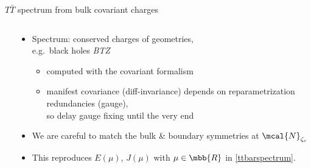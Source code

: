 \documentclass[
	10pt
	,handout
	,noamsthm
]{beamer}
\newcommand{\TTbar}{\texorpdfstring{\ensuremath{T\bar{T}}}{TTbar}\xspace}
\begin{document}
\begin{frame}{\TTbar spectrum from bulk covariant charges}{%
	\textcite{Kraus:2021cwf,Apolo:2023vnm}
}
\begin{columns}
\begin{column}{.35\textwidth}
\figGlueon
\end{column}
\begin{column}{.65\textwidth}
\vspace{-.3\baselineskip}
\begin{itemize}
\item Spectrum: conserved charges of geometries,\\
	e.g.~black holes \textit{BTZ} \cite{Banados:1992wn}
	\begin{itemize}
	\item computed with the covariant formalism\\
		\textcite{Iyer:1994ys, Barnich:2001jy}
	\item manifest covariance (diff-invariance) depends on reparametrization redundancies (gauge),\\
		so delay gauge fixing until the very end
	\end{itemize}
	
\pause
\item We are careful to match the bulk \& boundary symmetries at $\mcal{N}_{\zeta_c}$

\item This reproduces $E(\mu)$, $J(\mu)$ with $\mu \in\mbb{R}$ in \eqref{ttbarspectrum}.
	
\end{itemize}
\end{column}
\end{columns}
\end{frame}
\end{document}
